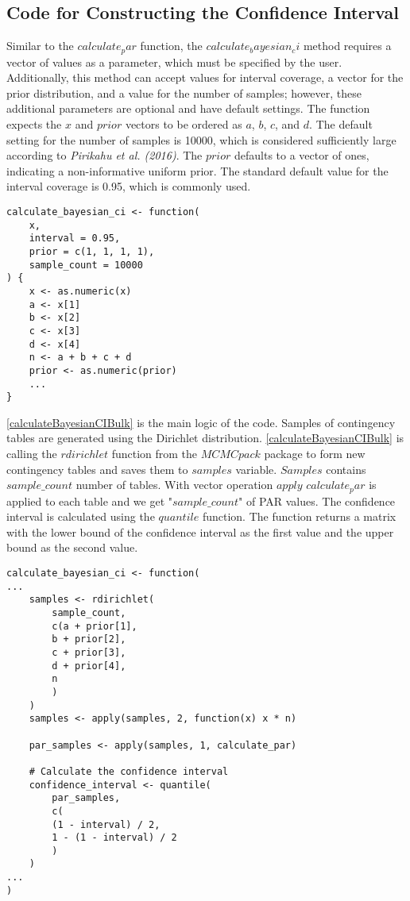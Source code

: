 \subsection{Code for Constructing the Confidence Interval}

Similar to the $calculate_par$ function, the $calculate_bayesian_ci$ method requires a vector of values as a parameter, which must be specified by the user. Additionally, this method can accept values for interval coverage, a vector for the prior distribution, and a value for the number of samples; however, these additional parameters are optional and have default settings. The function expects the $x$ and $prior$ vectors to be ordered as $a$, $b$, $c$, and $d$. The default setting for the number of samples is 10000, which is considered sufficiently large according to \textit{Pirikahu et al. (2016)}. The $prior$ defaults to a vector of ones, indicating a non-informative uniform prior. The standard default value for the interval coverage is 0.95, which is commonly used.

\begin{lstlisting}
calculate_bayesian_ci <- function(
    x,
    interval = 0.95,
    prior = c(1, 1, 1, 1),
    sample_count = 10000
) {
    x <- as.numeric(x)
    a <- x[1]
    b <- x[2]
    c <- x[3]
    d <- x[4]
    n <- a + b + c + d
    prior <- as.numeric(prior)
    ...
}
\end{lstlisting}

\ref{calculateBayesianCIBulk} is the main logic of the code. Samples of contingency tables are generated using the Dirichlet distribution. \ref{calculateBayesianCIBulk} is calling the $rdirichlet$ function from the $MCMCpack$ package to form new contingency tables and saves them to $samples$ variable. $Samples$ contains $sample\_count$ number of tables. With vector operation $apply$ $calculate_par$ is applied to each table and we get "$sample\_count$" of PAR values. The confidence interval is calculated using the $quantile$ function. The function returns a matrix with the lower bound of the confidence interval as the first value and the upper bound as the second value.

\begin{lstlisting}
calculate_bayesian_ci <- function(
...
    samples <- rdirichlet(
        sample_count,
        c(a + prior[1],
        b + prior[2],
        c + prior[3],
        d + prior[4],
        n
        )
    )
    samples <- apply(samples, 2, function(x) x * n)
    
    par_samples <- apply(samples, 1, calculate_par)
    
    # Calculate the confidence interval
    confidence_interval <- quantile(
        par_samples,
        c(
        (1 - interval) / 2,
        1 - (1 - interval) / 2
        )
    )
...
)
\end{lstlisting}\label{calculateBayesianCIBulk}

